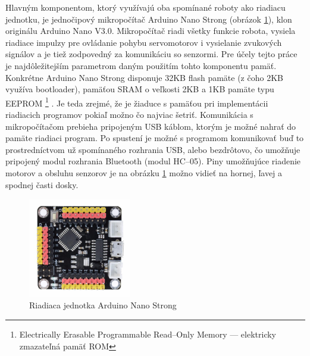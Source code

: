 Hlavným komponentom, ktorý využívajú oba spomínané roboty ako riadiacu jednotku, je jednočipový mikropočítač Arduino Nano Strong (obrázok \ref{obr:arduino}), klon originálu Arduino Nano V3.0. Mikropočítač riadi všetky funkcie robota, vysiela riadiace impulzy pre ovládanie pohybu servomotorov i vysielanie zvukových signálov a je tiež zodpovedný za komunikáciu so senzormi. Pre účely tejto práce je najdôležitejším parametrom daným použitím tohto komponentu pamäť. Konkrétne Arduino Nano Strong disponuje 32KB flash pamäte (z čoho 2KB využíva bootloader), pamäťou SRAM o veľkosti 2KB a 1KB pamäte typu EEPROM \footnote{Electrically Erasable Programmable Read--Only Memory --- elektricky zmazateľná pamäť ROM} \cite{ArduinoNanoStrongSpecification}. Je teda zrejmé, že je žiaduce s pamäťou pri implementácii riadiacich programov pokiaľ možno čo najviac šetriť. Komunikácia s mikropočítačom prebieha pripojeným USB káblom, ktorým je možné nahrať do pamäte riadiaci program. Po spustení je možné s programom komunikovať buď to prostredníctvom už spomínaného rozhrania USB, alebo bezdrôtovo, čo umožňuje pripojený modul rozhrania Bluetooth (modul HC--05). Piny umožňujúce riadenie motorov a obsluhu senzorov je na obrázku \ref{obr:arduino} možno vidieť na hornej, ľavej a spodnej časti dosky.


\begin{figure}
\centerline{\includegraphics[width=0.4\textwidth]{images/arduino-nano-strong}}
\caption[Riadiaca jednotka Arduino Nano Strong]{Riadiaca jednotka Arduino Nano Strong}
\label{obr:arduino}
\end{figure}

